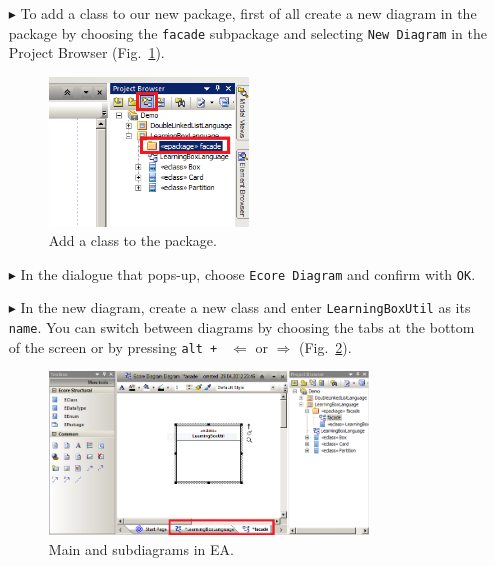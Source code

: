 \begin{enumerate}
\item[$\blacktriangleright$] To add a class to our new package, first of all create a new diagram in the package by choosing the \texttt{facade} subpackage and selecting \texttt{New Diagram} in the Project Browser (Fig.~\ref{fig:epackage_newelement}).

\begin{figure}[htbp]
	\centering
  \includegraphics[width=0.5\textwidth]{pics/memBoxBilder/memBox19}
	\caption{Add a class to the package.}
	\label{fig:epackage_newelement}
\end{figure}

\item[$\blacktriangleright$] In the dialogue that pops-up, choose \texttt{Ecore Diagram} and confirm with \texttt{OK}.
\item[$\blacktriangleright$] In the new diagram, create a new class and enter \texttt{LearningBoxUtil} as its \texttt{name}.  
You can switch between diagrams by choosing the tabs at the bottom of the screen or by pressing \texttt{alt + } $\Leftarrow$ or $\Rightarrow$ (Fig.~\ref{fig:epackage_newdiagram}). 

\begin{figure}[htbp] 
	\centering
  \includegraphics[width=0.8\textwidth]{pics/memBoxBilder/memBox20}
	\caption{Main and subdiagrams in EA.}
	\label{fig:epackage_newdiagram}
\end{figure} 


\end{enumerate}
